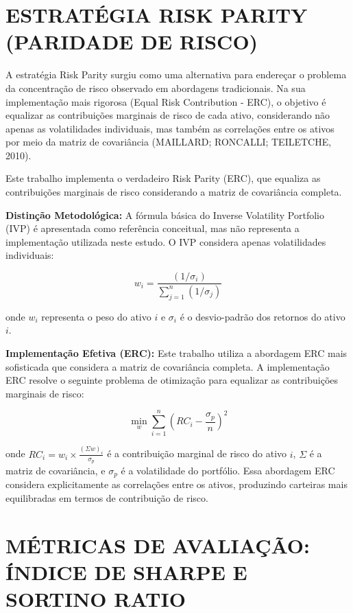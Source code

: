 \section{ESTRATÉGIA RISK PARITY (PARIDADE DE RISCO)}

A estratégia Risk Parity surgiu como uma alternativa para endereçar o problema da concentração de risco observado em abordagens tradicionais. Na sua implementação mais rigorosa (Equal Risk Contribution - ERC), o objetivo é equalizar as contribuições marginais de risco de cada ativo, considerando não apenas as volatilidades individuais, mas também as correlações entre os ativos por meio da matriz de covariância (MAILLARD; RONCALLI; TEILETCHE, 2010).

Este trabalho implementa o verdadeiro Risk Parity (ERC), que equaliza as contribuições marginais de risco considerando a matriz de covariância completa. 

\textbf{Distinção Metodológica:} A fórmula básica do Inverse Volatility Portfolio (IVP) é apresentada como referência conceitual, mas não representa a implementação utilizada neste estudo. O IVP considera apenas volatilidades individuais:

\begin{equation}
\label{eq:risk_parity}
w_i = \frac{(1/\sigma_i)}{\sum_{j=1}^{n}(1/\sigma_j)}
\end{equation}

onde $w_i$ representa o peso do ativo $i$ e $\sigma_i$ é o desvio-padrão dos retornos do ativo $i$.

\textbf{Implementação Efetiva (ERC):} Este trabalho utiliza a abordagem ERC mais sofisticada que considera a matriz de covariância completa. A implementação ERC resolve o seguinte problema de otimização para equalizar as contribuições marginais de risco:

\begin{equation}
\label{eq:erc_optimization}
\min_{w} \sum_{i=1}^{n} \left( RC_i - \frac{\sigma_p}{n} \right)^2
\end{equation}

onde $RC_i = w_i \times \frac{(\Sigma w)_i}{\sigma_p}$ é a contribuição marginal de risco do ativo $i$, $\Sigma$ é a matriz de covariância, e $\sigma_p$ é a volatilidade do portfólio. Essa abordagem ERC considera explicitamente as correlações entre os ativos, produzindo carteiras mais equilibradas em termos de contribuição de risco.

\section{MÉTRICAS DE AVALIAÇÃO: ÍNDICE DE SHARPE E SORTINO RATIO}

